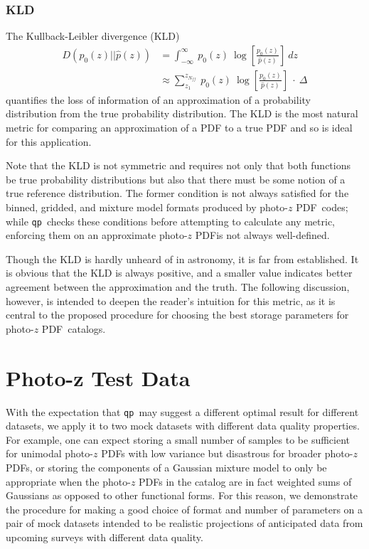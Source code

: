 \documentclass[\docopts]{\docclass}
\newcommand{\qp}{\texttt{qp}}
\newcommand{\pz}{photo-$z$ PDF}
\begin{document}
\subsubsection{KLD}
\label{sec:kld}

The Kullback-Leibler divergence (KLD)
\begin{align}
  \label{eq:kld}
  D(p_{0}(z) || \hat{p}(z)) &= \int_{-\infty}^{\infty}\ p_{0}(z)\ 
\log\left[\frac{p_{0}(z)}{\hat{p}(z)}\right]\ dz\\
  &\approx \sum_{z_{1}}^{z_{N_{ff}}}\ p_{0}(z)\ 
\log\left[\frac{p_{0}(z)}{\hat{p}(z)}\right]\ \cdot\ \Delta
\end{align}
quantifies the loss of information of an approximation of a probability 
distribution from the true probability distribution.  The KLD is the most 
natural metric for comparing an approximation of a PDF to a true PDF and so is 
ideal for this application.

Note that the KLD is not symmetric and requires not only that both functions be 
true probability distributions but also that there must be some notion of a 
true reference distribution.  The former condition is not always satisfied for 
the binned, gridded, and mixture model formats produced by \pz\ codes; while 
\qp\ checks these conditions before attempting to calculate any metric, 
enforcing them on an approximate \pz is not always well-defined.

Though the KLD is hardly unheard of in astronomy, it is far from established.  
It is obvious that the KLD is always positive, and a smaller value indicates 
better agreement between the approximation and the truth.  The following 
discussion, however, is intended to deepen the reader's intuition for this 
metric, as it is central to the proposed procedure for choosing the best 
storage parameters for \pz\ catalogs.



\section{Photo-z Test Data}
\label{sec:data}

With the expectation that \qp\  may suggest a different optimal result for 
different datasets, we apply it to two mock datasets with different data 
quality properties.  For example, one can expect storing a small number of 
samples to be sufficient for unimodal \pz s with low variance but disastrous 
for broader \pz s, or storing the components of a Gaussian mixture model to 
only be appropriate when the \pz s in the catalog are in fact weighted sums of 
Gaussians as opposed to other functional forms.  For this reason, we 
demonstrate the procedure for making a good choice of format and number of 
parameters on a pair of mock datasets intended to be realistic projections of 
anticipated data from upcoming surveys with different data quality.
\end{document}
